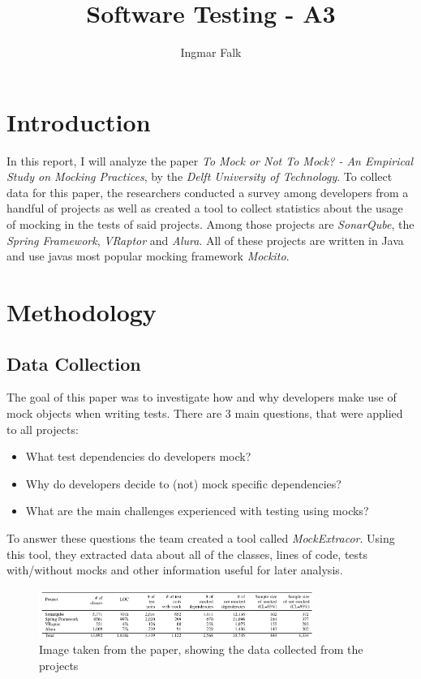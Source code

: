 \documentclass[11pt,a4paper]{article}
\begin{document}
\title{Software Testing - A3}
\author{Ingmar Falk}
\maketitle
\pagebreak

\section{Introduction}

In this report, I will analyze the paper \textit{To Mock or Not To Mock? - An Empirical Study on Mocking Practices}, by the \textit{Delft University of Technology}.
To collect data for this paper, the researchers conducted a survey among developers from a handful of projects as well as created a 
tool to collect statistics about the usage of mocking in the tests of said projects. Among those projects are \textit{SonarQube},
the \textit{Spring Framework}, \textit{VRaptor} and \textit{Alura}. All of these projects are written in Java and use javas most popular
mocking framework \textit{Mockito}.

\section{Methodology}

\subsection{Data Collection}

The goal of this paper was to investigate how and why developers make use of mock objects when writing tests. There are 3 main
questions, that were applied to all projects:

\begin{itemize}
    \item What test dependencies do developers mock?
    \item Why do developers decide to (not) mock specific dependencies?
    \item What are the main challenges experienced with testing using mocks?
\end{itemize}

To answer these questions the team created a tool called \emph{\textit{MockExtracor}}. Using this tool, they extracted data
about all of the classes, lines of code, tests with/without mocks and other information useful for later analysis.

\begin{figure}[h]
    \centering
    \includegraphics[width=0.8\textwidth]{images/source.png}
    \caption{Image taken from the paper, showing the data collected from the projects}
\end{figure}
\end{document}
